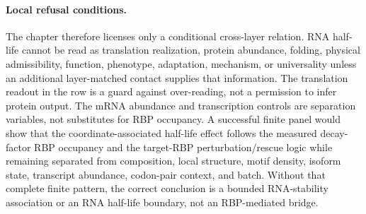 \paragraph{Local refusal conditions.}
The chapter therefore licenses only a conditional cross-layer relation.  RNA half-life cannot be read as translation realization, protein abundance, folding, physical admissibility, function, phenotype, adaptation, mechanism, or universality unless an additional layer-matched contact supplies that information.  The translation readout in the row is a guard against over-reading, not a permission to infer protein output.  The mRNA abundance and transcription controls are separation variables, not substitutes for RBP occupancy.  A successful finite panel would show that the coordinate-associated half-life effect follows the measured decay-factor RBP occupancy and the target-RBP perturbation/rescue logic while remaining separated from composition, local structure, motif density, isoform state, transcript abundance, codon-pair context, and batch.  Without that complete finite pattern, the correct conclusion is a bounded RNA-stability association or an RNA half-life boundary, not an RBP-mediated bridge.
